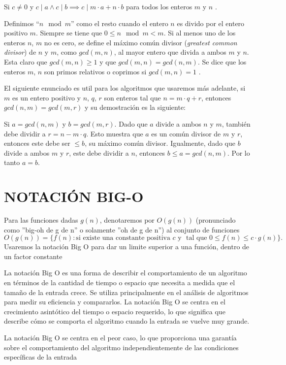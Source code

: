     Si $c\not = 0$ y $c \mid a \land c \mid b \implies c\mid m\cdot a + n\cdot b$ para todos los enteros $m$ y $n$ \citep{HW1975}.

    Definimos “$n \mod m$” como el resto cuando el entero $n$ es divido por el entero positivo $m$. Siempre se tiene que $0 \leq n \mod m < m$.
    Si al menos uno de los enteros $n$, $m$ no es cero, se define el máximo común divisor (\textit{greatest common divisor}) de $n$ y $m$, como $gcd(m,n)$, al mayor entero que divida a ambos $m$ y $n$. Esta claro que $gcd(m,n) \geq 1$ y que $gcd(m,n) = gcd(n,m)$. Se dice que los enteros $m$, $n$ son primos relativos o coprimos si $gcd(m,n) = 1$ \citep{Wagstaff2013}.

    El siguiente enunciado es util para los algoritmos que usaremos más adelante, si $m$ es un entero positivo y $n$, $q$, $r$ son enteros tal que $n = m\cdot q + r$, entonces $gcd(n,m) = gcd(m,r)$ y su demostración es la siguiente:

    Si $a = gcd(n,m)$ y $b=gcd(m,r)$. Dado que $a$ divide a ambos $n$ y $m$, también debe dividir a $r =n-m\cdot q$. Esto muestra que $a$ es un común divisor de $m$ y $r$, entonces este debe ser $\leq b$, su máximo común divisor. Igualmente, dado que $b$ divide a ambos $m$ y $r$, este debe dividir a $n$, entonces $b \leq a = gcd(n,m)$. Por lo tanto $a = b$.

    \section{NOTACIÓN BIG-O}
    Para las funciones dadas $g(n)$, denotaremos por $O(g(n))$ (pronunciado como ''big-oh de g de n'' o solamente ''oh de g de n'') al conjunto de funciones
    \[
        O(g(n)) = \{ f(n):\text{si existe una constante positiva }c \text{ y }\text{ tal que } 0 \leq f(n) \leq c\cdot g(n)\}.
    \]
    Usaremos la notación Big O para dar un limite superior a una función, dentro de un factor constante \citep{Cormen2009}

    La notación Big O es una forma de describir el comportamiento de un algoritmo en términos de la cantidad de tiempo o espacio que necesita a medida que el tamaño de la entrada crece. Se utiliza principalmente en el análisis de algoritmos para medir su eficiencia y compararlos. La notación Big O se centra en el crecimiento asintótico del tiempo o espacio requerido, lo que significa que describe cómo se comporta el algoritmo cuando la entrada se vuelve muy grande.

    La notación Big O se centra en el peor caso, lo que proporciona una garantía sobre el comportamiento del algoritmo independientemente de las condiciones específicas de la entrada


